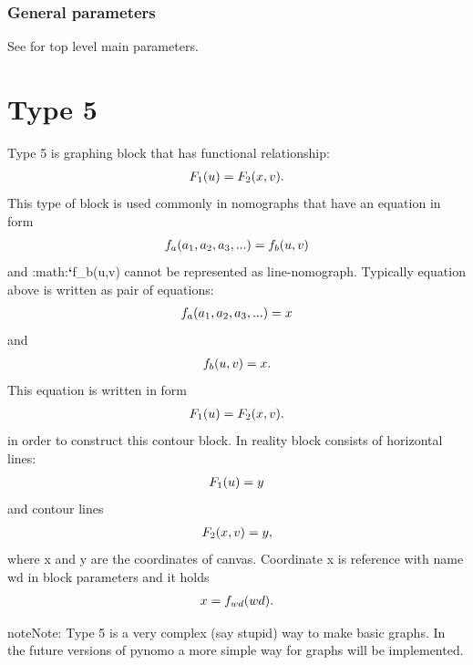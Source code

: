 \documentclass[a4paper,11pt,english]{sphinxmanual}
\begin{document}
\subsubsection{General parameters}
\label{types/types:id16}
See {\hyperref[main_params:main-params]{\emph{}}} for top level main parameters.


\section{Type 5}
\label{types/types:type-5}\label{types/types:type5-ref}
Type 5 is graphing block that has functional relationship:
\begin{gather}
\begin{split}F_1(u) = F_2(x,v).\end{split}\notag
\end{gather}
This type of block is used commonly in nomographs that have an equation in form
\begin{gather}
\begin{split}f_a(a_1,a_2,a_3,...) = f_b(u,v)\end{split}\notag
\end{gather}
and :math:{\color{red}\bfseries{}{}`}f\_b(u,v) cannot be represented as line-nomograph.
Typically equation above is written as pair of equations:
\begin{gather}
\begin{split}f_a(a_1,a_2,a_3,...) = x\end{split}\notag
\end{gather}
and
\begin{gather}
\begin{split}f_b(u,v) = x.\end{split}\notag
\end{gather}
This equation is written in form
\begin{gather}
\begin{split}F_1(u) = F_2(x,v).\end{split}\notag
\end{gather}
in order to construct this contour block. In reality block consists of horizontal lines:
\begin{gather}
\begin{split}F_1(u) = y\end{split}\notag
\end{gather}
and contour lines
\begin{gather}
\begin{split}F_2(x,v) = y,\end{split}\notag
\end{gather}
where x and y are the coordinates of canvas. Coordinate x is reference with name wd in block parameters and it holds
\begin{gather}
\begin{split}x = f_{wd}(wd).\end{split}\notag
\end{gather}
\begin{notice}{note}{Note:}
Type 5 is a very complex (say stupid) way to make basic graphs. In the future versions of pynomo a more simple way for graphs will be implemented.
\end{notice}
\end{document}
